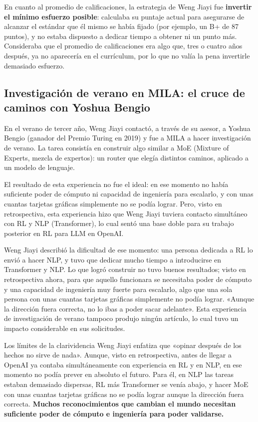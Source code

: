 En cuanto al promedio de calificaciones, la estrategia de Weng Jiayi fue \textbf{invertir el mínimo esfuerzo posible}: calculaba su puntaje actual para asegurarse de alcanzar el estándar que él mismo se había fijado (por ejemplo, un B+ de 87 puntos), y no estaba dispuesto a dedicar tiempo a obtener ni un punto más. Consideraba que el promedio de calificaciones era algo que, tres o cuatro años después, ya no aparecería en el currículum, por lo que no valía la pena invertirle demasiado esfuerzo.

\subsection{Investigación de verano en MILA: el cruce de caminos con Yoshua Bengio}

En el verano de tercer año, Weng Jiayi contactó, a través de su asesor, a Yoshua Bengio (ganador del Premio Turing en 2019) y fue a MILA a hacer investigación de verano. La tarea consistía en construir algo similar a MoE (Mixture of Experts, mezcla de expertos): un router que elegía distintos caminos, aplicado a un modelo de lenguaje.

El resultado de esta experiencia no fue el ideal: en ese momento no había suficiente poder de cómputo ni capacidad de ingeniería para escalarlo, y con unas cuantas tarjetas gráficas simplemente no se podía lograr. Pero, visto en retrospectiva, esta experiencia hizo que Weng Jiayi tuviera contacto simultáneo con RL y NLP (Transformer), lo cual sentó una base doble para su trabajo posterior en RL para LLM en OpenAI.

Weng Jiayi describió la dificultad de ese momento: una persona dedicada a RL lo envió a hacer NLP, y tuvo que dedicar mucho tiempo a introducirse en Transformer y NLP. Lo que logró construir no tuvo buenos resultados; visto en retrospectiva ahora, para que aquello funcionara se necesitaba poder de cómputo y una capacidad de ingeniería muy fuerte para escalarlo, algo que una sola persona con unas cuantas tarjetas gráficas simplemente no podía lograr. «Aunque la dirección fuera correcta, no lo ibas a poder sacar adelante». Esta experiencia de investigación de verano tampoco produjo ningún artículo, lo cual tuvo un impacto considerable en sus solicitudes.

\begin{warningbox}{Los límites de la clarividencia}
Weng Jiayi enfatiza que «opinar después de los hechos no sirve de nada». Aunque, visto en retrospectiva, antes de llegar a OpenAI ya contaba simultáneamente con experiencia en RL y en NLP, en ese momento no podía prever en absoluto el futuro. Para él, en NLP las tareas estaban demasiado dispersas, RL más Transformer se venía abajo, y hacer MoE con unas cuantas tarjetas gráficas no se podía lograr aunque la dirección fuera correcta. \textbf{Muchos reconocimientos que cambian el mundo necesitan suficiente poder de cómputo e ingeniería para poder validarse.}
\end{warningbox}

